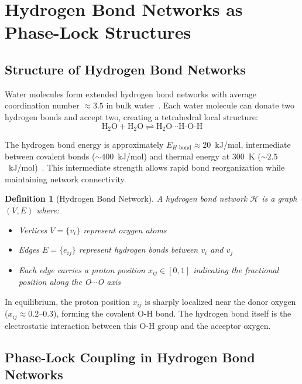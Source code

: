 \documentclass[twocolumn,showpacs,preprintnumbers,amsmath,amssymb,prd]{revtex4-2}
\newtheorem{definition}[theorem]{Definition}
\newcommand{\Hbond}{H\text{-bond}}
\begin{document}
\section{Hydrogen Bond Networks as Phase-Lock Structures}
\label{sec:hydrogen_networks}

\subsection{Structure of Hydrogen Bond Networks}

Water molecules form extended hydrogen bond networks with average coordination number $\approx 3.5$ in bulk water~\cite{Stillinger1980}. Each water molecule can donate two hydrogen bonds and accept two, creating a tetrahedral local structure:
\begin{equation}
\text{H}_2\text{O} + \text{H}_2\text{O} \rightleftharpoons \text{H}_2\text{O}\cdots\text{H-O-H}
\label{eq:hbond}
\end{equation}

The hydrogen bond energy is approximately $E_{\Hbond} \approx 20$~kJ/mol, intermediate between covalent bonds ($\sim 400$~kJ/mol) and thermal energy at 300~K ($\sim 2.5$~kJ/mol)~\cite{Jeffrey1997}. This intermediate strength allows rapid bond reorganization while maintaining network connectivity.

\begin{definition}[Hydrogen Bond Network]
\label{def:hbond_network}
A hydrogen bond network $\mathcal{H}$ is a graph $(V, E)$ where:
\begin{itemize}
\item Vertices $V = \{v_i\}$ represent oxygen atoms
\item Edges $E = \{e_{ij}\}$ represent hydrogen bonds between $v_i$ and $v_j$
\item Each edge carries a proton position $x_{ij} \in [0, 1]$ indicating the fractional position along the O$\cdots$O axis
\end{itemize}
\end{definition}

In equilibrium, the proton position $x_{ij}$ is sharply localized near the donor oxygen ($x_{ij} \approx 0.2$--$0.3$), forming the covalent O-H bond. The hydrogen bond itself is the electrostatic interaction between this O-H group and the acceptor oxygen.

\subsection{Phase-Lock Coupling in Hydrogen Bond Networks}
\end{document}
